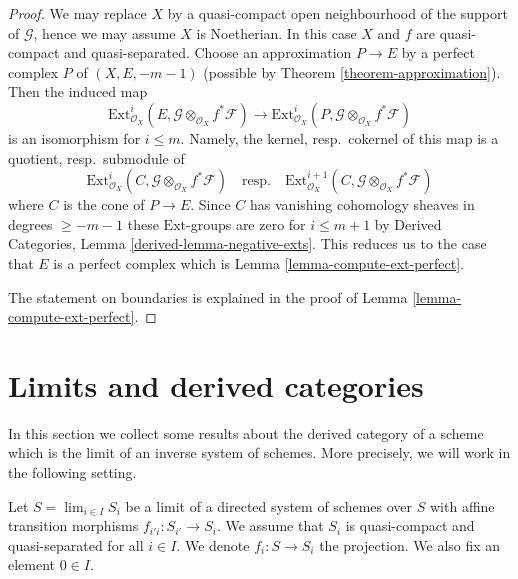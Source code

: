 \begin{proof}
We may replace $X$ by a quasi-compact open neighbourhood of
the support of $\mathcal{G}$, hence we may assume $X$ is Noetherian.
In this case $X$ and $f$ are quasi-compact and quasi-separated.
Choose an approximation $P \to E$ by a perfect complex $P$ of $(X, E, -m - 1)$
(possible by Theorem \ref{theorem-approximation}).
Then the induced map
$$
\text{Ext}^i_{\mathcal{O}_X}(E,
\mathcal{G} \otimes_{\mathcal{O}_X} f^*\mathcal{F})
\longrightarrow
\text{Ext}^i_{\mathcal{O}_X}(P,
\mathcal{G} \otimes_{\mathcal{O}_X} f^*\mathcal{F})
$$
is an isomorphism for $i \leq m$. Namely, the kernel, resp.\ cokernel of this
map is a quotient, resp.\ submodule of
$$
\text{Ext}^i_{\mathcal{O}_X}(C,
\mathcal{G} \otimes_{\mathcal{O}_X} f^*\mathcal{F})
\quad\text{resp.}\quad
\text{Ext}^{i + 1}_{\mathcal{O}_X}(C,
\mathcal{G} \otimes_{\mathcal{O}_X} f^*\mathcal{F})
$$
where $C$ is the cone of $P \to E$. Since $C$ has vanishing cohomology
sheaves in degrees $\geq -m - 1$ these $\text{Ext}$-groups are zero
for $i \leq m + 1$ by
Derived Categories, Lemma \ref{derived-lemma-negative-exts}.
This reduces us to the case that
$E$ is a perfect complex which is Lemma \ref{lemma-compute-ext-perfect}.

\medskip\noindent
The statement on boundaries is explained in the proof of
Lemma \ref{lemma-compute-ext-perfect}.
\end{proof}







\section{Limits and derived categories}
\label{section-limits}

\noindent
In this section we collect some results about the derived category
of a scheme which is the limit of an inverse system of schemes.
More precisely, we will work in the following setting.

\begin{situation}
\label{situation-descent}
Let $S = \lim_{i \in I} S_i$ be a limit of a directed system of schemes
over $S$ with affine transition morphisms $f_{i'i} : S_{i'} \to S_i$.
We assume that $S_i$ is quasi-compact and quasi-separated for all $i \in I$.
We denote $f_i : S \to S_i$ the projection. We also fix an element $0 \in I$.
\end{situation}

